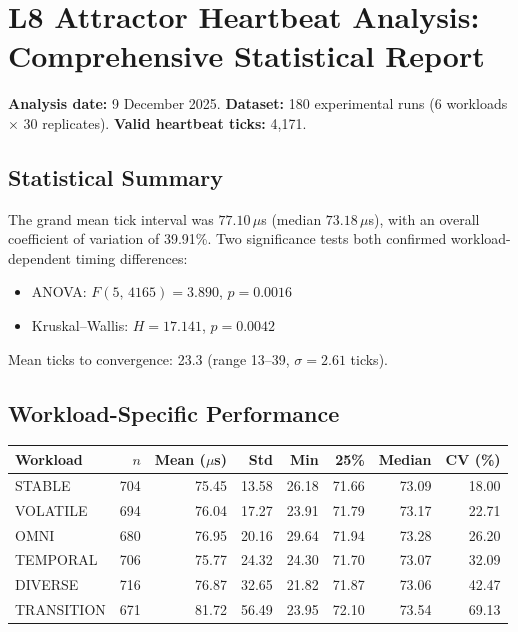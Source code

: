
\section{L8 Attractor Heartbeat Analysis: Comprehensive Statistical Report}

\textbf{Analysis date:} 9 December 2025. \textbf{Dataset:} 180 experimental
runs (6 workloads $\times$ 30 replicates). \textbf{Valid heartbeat ticks:}
4{,}171.

\subsection{Statistical Summary}

The grand mean tick interval was $77.10\,\mu$s (median $73.18\,\mu$s),
with an overall coefficient of variation of 39.91\%. Two significance tests
both confirmed workload-dependent timing differences:

\begin{itemize}
  \item ANOVA: $F(5,\,4165) = 3.890$, $p = 0.0016$
  \item Kruskal--Wallis: $H = 17.141$, $p = 0.0042$
\end{itemize}

Mean ticks to convergence: 23.3 (range 13--39, $\sigma = 2.61$ ticks).

\subsection{Workload-Specific Performance}

\begin{center}
\begin{tabular}{lrrrrrrr}
\toprule
Workload    & $n$ & Mean ($\mu$s) & Std & Min & 25\% & Median & CV (\%) \\
\midrule
STABLE      & 704 & 75.45 & 13.58 & 26.18 & 71.66 & 73.09 & 18.00 \\
VOLATILE    & 694 & 76.04 & 17.27 & 23.91 & 71.79 & 73.17 & 22.71 \\
OMNI        & 680 & 76.95 & 20.16 & 29.64 & 71.94 & 73.28 & 26.20 \\
TEMPORAL    & 706 & 75.77 & 24.32 & 24.30 & 71.70 & 73.07 & 32.09 \\
DIVERSE     & 716 & 76.87 & 32.65 & 21.82 & 71.87 & 73.06 & 42.47 \\
TRANSITION  & 671 & 81.72 & 56.49 & 23.95 & 72.10 & 73.54 & 69.13 \\
\bottomrule
\end{tabular}
\end{center}

